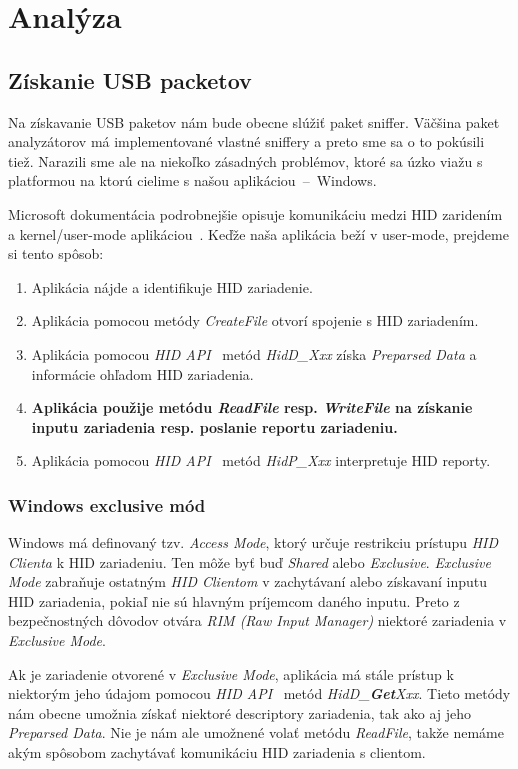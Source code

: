 \chapter{Analýza}
\section{Získanie USB packetov}
Na získavanie USB paketov nám bude obecne slúžiť paket sniffer. Väčšina paket analyzátorov má implementované vlastné sniffery a preto sme sa o to pokúsili tiež. Narazili sme ale na niekoľko zásadných problémov, ktoré sa úzko viažu s platformou na ktorú cielime s našou aplikáciou~--~Windows.

Microsoft dokumentácia podrobnejšie opisuje komunikáciu medzi HID zaridením a kernel/user-mode aplikáciou~\cite{hid_opening_collections}. Keďže naša aplikácia beží v user-mode, prejdeme si tento spôsob:
\begin{enumerate}
\item Aplikácia nájde a identifikuje HID zariadenie.
\item Aplikácia pomocou metódy \textit{CreateFile} otvorí spojenie s HID zariadením.
\item Aplikácia pomocou \textit{HID API}~\cite{hid_api} metód \textit{HidD\_Xxx} získa \textit{Preparsed Data} a informácie ohľadom HID zariadenia.
\item \textbf{Aplikácia použije metódu \textit{ReadFile} resp. \textit{WriteFile} na získanie inputu zariadenia resp. poslanie reportu zariadeniu.}
\item Aplikácia pomocou \textit{HID API}~\cite{hid_api} metód \textit{HidP\_Xxx} interpretuje HID reporty.
\end{enumerate}

\subsection{Windows exclusive mód}
Windows má definovaný tzv. \textit{Access Mode}, ktorý určuje restrikciu prístupu \textit{HID Clienta} k HID zariadeniu. 
Ten môže byť buď \textit{Shared} alebo \textit{Exclusive}. \textit{Exclusive Mode} zabraňuje ostatným \textit{HID Clientom} v zachytávaní alebo získavaní inputu HID zariadenia, pokiaľ nie sú hlavným príjemcom daného inputu. Preto z bezpečnostných dôvodov otvára \textit{RIM (Raw Input Manager)} niektoré zariadenia v \textit{Exclusive Mode}.

Ak je zariadenie otvorené v \textit{Exclusive Mode}, aplikácia má stále prístup k niektorým jeho údajom pomocou  \textit{HID API}~\cite{hid_api} metód  \textit{HidD\_\textbf{Get}Xxx}. Tieto metódy nám obecne umožnia získať niektoré descriptory zariadenia, tak ako aj jeho \textit{Preparsed Data}. Nie je nám ale umožnené volať metódu \textit{ReadFile}, takže nemáme akým spôsobom zachytávať komunikáciu HID zariadenia s clientom.

